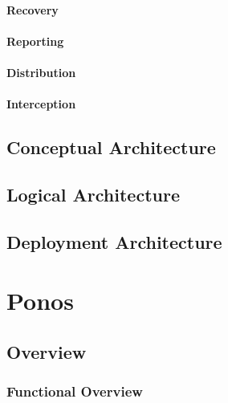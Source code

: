 \documentclass[a4paper]{book}
\begin{document}
\subsubsection{Recovery}
\subsubsection{Reporting}
\subsubsection{Distribution}
\subsubsection{Interception}

\section{Conceptual Architecture}
\section{Logical Architecture}
\section{Deployment Architecture}

\chapter{Ponos}
\section{Overview}
\subsection{Functional Overview}
\end{document}
